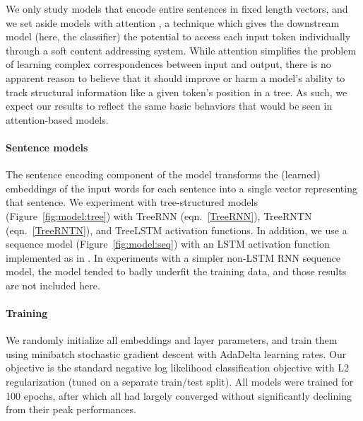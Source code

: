 We only study models that encode entire sentences in fixed length vectors, and we set aside models with attention \cite{bahdanau2014neural}, a technique which gives the downstream model (here, the classifier) the potential to access each input token individually through a soft content addressing system. While attention simplifies the problem of learning complex correspondences between input and output, there is no apparent reason to believe that it should improve or harm a model's ability to track structural information like a given token's position in a tree. As such, we expect our results to reflect the same basic behaviors that would be seen in attention-based models.

\paragraph{Sentence models}
The sentence encoding component of the model transforms the (learned) embeddings of the input words for each sentence into a single vector representing that sentence. We experiment with tree-structured models (Figure~\ref{fig:model:tree}) with TreeRNN (eqn.~\ref{TreeRNN}), TreeRNTN (eqn.~\ref{TreeRNTN}), and TreeLSTM \cite{tai2015improved} activation functions. In addition, we use a sequence model (Figure~\ref{fig:model:seq}) with an LSTM activation function \cite{hochreiter1997long} implemented as in . In experiments with a simpler non-LSTM RNN sequence model, the model tended to badly underfit the training data, and those results are not included here.

\paragraph{Training} We randomly initialize all embeddings and layer parameters, and train them using minibatch stochastic gradient descent with AdaDelta \cite{zeiler2012adadelta} learning rates. Our objective is the standard negative log likelihood classification objective with L2 regularization (tuned on a separate train/test split). All models were trained for 100 epochs, after which all had largely converged without significantly declining from their peak performances.
